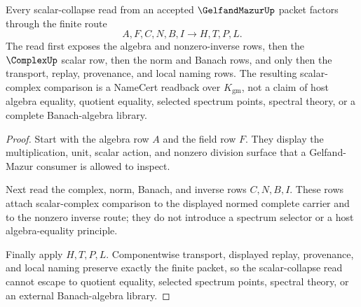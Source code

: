 \begin{theorem}
\label{thm:gelfand-mazur-complex-scalar-collapse}
Every scalar-collapse read from an accepted $\GelfandMazurUp$ packet factors through the finite route
$$
A,F,C,N,B,I \longrightarrow H,T,P,L .
$$
The read first exposes the algebra and nonzero-inverse rows, then the $\ComplexUp$ scalar row, then the norm and Banach rows, and only then the transport, replay, provenance, and local naming rows. The resulting scalar-complex comparison is a NameCert readback over $K_{\mathrm{gm}}$, not a claim of host algebra equality, quotient equality, selected spectrum points, spectral theory, or a complete Banach-algebra library.
\end{theorem}
\begin{proof}
Start with the algebra row $A$ and the field row $F$. They display the multiplication, unit, scalar action, and nonzero division surface that a Gelfand-Mazur consumer is allowed to inspect.

Next read the complex, norm, Banach, and inverse rows $C,N,B,I$. These rows attach scalar-complex comparison to the displayed normed complete carrier and to the nonzero inverse route; they do not introduce a spectrum selector or a host algebra-equality principle.

Finally apply $H,T,P,L$. Componentwise transport, displayed replay, provenance, and local naming preserve exactly the finite packet, so the scalar-collapse read cannot escape to quotient equality, selected spectrum points, spectral theory, or an external Banach-algebra library.
\end{proof}




